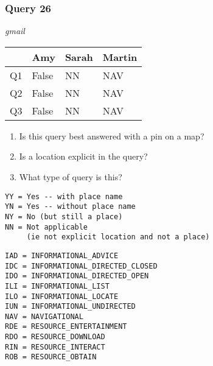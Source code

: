 \begin{frame}[fragile]
\frametitle{Query 26}
\vspace{1em}

\emph{gmail}

\vfill

\begin{table}
  \centering
  \begin{tabular}{ l l l l }
    & \textbf{Amy} & \textbf{Sarah} & \textbf{Martin}\\
    \toprule
    Q1 & False & NN & NAV\\
Q2 & False & NN & NAV\\
Q3 & False & NN & NAV\\
    \bottomrule
  \end{tabular}
\end{table}

\vfill

\tiny{

\begin{enumerate}
\item Is this query best answered with a pin on a map?
\item Is a location explicit in the query?
\item What type of query is this?
\end{enumerate}

\vfill

\begin{multicols}{2}
\begin{verbatim}
YY = Yes -- with place name
YN = Yes -- without place name
NY = No (but still a place)
NN = Not applicable 
     (ie not explicit location and not a place)
\end{verbatim}

\columnbreak
\begin{verbatim}
IAD = INFORMATIONAL_ADVICE
IDC = INFORMATIONAL_DIRECTED_CLOSED
IDO = INFORMATIONAL_DIRECTED_OPEN
ILI = INFORMATIONAL_LIST
ILO = INFORMATIONAL_LOCATE
IUN = INFORMATIONAL_UNDIRECTED
NAV = NAVIGATIONAL
RDE = RESOURCE_ENTERTAINMENT
RDO = RESOURCE_DOWNLOAD
RIN = RESOURCE_INTERACT
ROB = RESOURCE_OBTAIN
\end{verbatim}
\end{multicols}
}

\end{frame}


